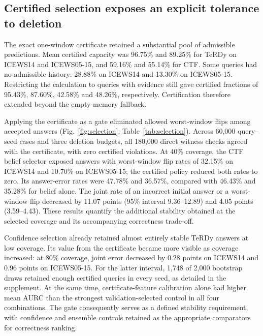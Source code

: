 \subsection{Certified selection exposes an explicit tolerance to deletion}
The exact one-window certificate retained a substantial pool of admissible predictions. Mean certified capacity was 96.75\% and 89.25\% for TeRDy on ICEWS14 and ICEWS05-15, and 59.16\% and 55.14\% for CTF. Some queries had no admissible history: 28.88\% on ICEWS14 and 13.30\% on ICEWS05-15. Restricting the calculation to queries with evidence still gave certified fractions of 95.43\%, 87.60\%, 42.58\% and 48.26\%, respectively. Certification therefore extended beyond the empty-memory fallback.

Applying the certificate as a gate eliminated allowed worst-window flips among accepted answers (Fig.~\ref{fig:selection}; Table~\ref{tab:selection}). Across 60,000 query--seed cases and three deletion budgets, all 180,000 direct witness checks agreed with the certificate, with zero certified violations. At 40\% coverage, the CTF belief selector exposed answers with worst-window flip rates of 32.15\% on ICEWS14 and 10.70\% on ICEWS05-15; the certified policy reduced both rates to zero. Its answer-error rates were 47.78\% and 36.57\%, compared with 46.43\% and 35.28\% for belief alone. The joint rate of an incorrect initial answer or a worst-window flip decreased by 11.07 points (95\% interval 9.36--12.89) and 4.05 points (3.59--4.43). These results quantify the additional stability obtained at the selected coverage and its accompanying correctness trade-off.

Confidence selection already retained almost entirely stable TeRDy answers at low coverage. Its value from the certificate became more visible as coverage increased: at 80\% coverage, joint error decreased by 0.28 points on ICEWS14 and 0.96 points on ICEWS05-15. For the latter interval, 1,748 of 2,000 bootstrap draws retained enough certified queries in every seed, as detailed in the supplement. At the same time, certificate-feature calibration alone had higher mean AURC than the strongest validation-selected control in all four combinations. The gate consequently serves as a defined stability requirement, with confidence and ensemble controls retained as the appropriate comparators for correctness ranking.

